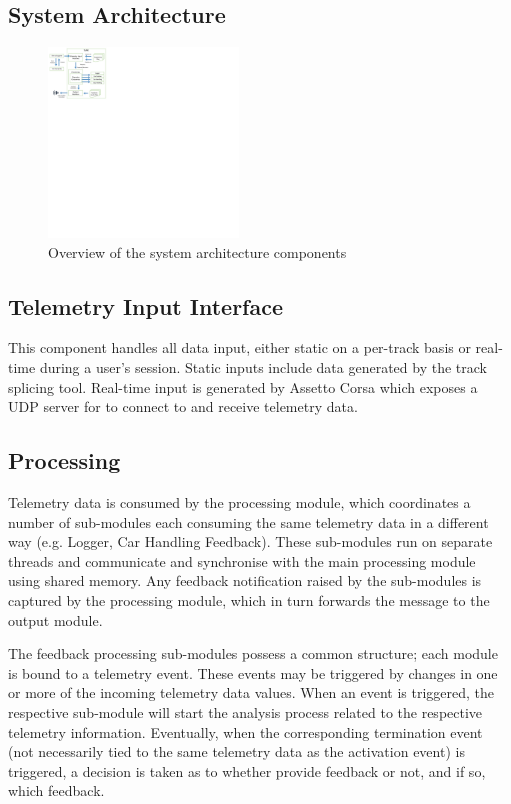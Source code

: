 \documentclass{sig-alternate}
\begin{document}
\subsection{System Architecture}

\begin{figure}[!htb]
	\centering
	\includegraphics[width=0.45\textwidth]{diagrams/SystemArch}
	\caption{Overview of the system architecture components}
	\label{fig:SystemArch}
\end{figure}

\subsection{Telemetry Input Interface}
This component handles all data input, either static on a per-track basis or real-time during a user's session. Static inputs include data generated by the track splicing tool. Real-time input is generated by Assetto Corsa which exposes a UDP server for \methodname to connect to and receive telemetry data.

\subsection{Processing}
Telemetry data is consumed by the processing module, which coordinates a number of sub-modules each consuming the same telemetry data in a different way (e.g. Logger, Car Handling Feedback). These sub-modules run on separate threads and communicate and synchronise with the main processing module using shared memory. Any feedback notification raised by the sub-modules is captured by the processing module, which in turn forwards the message to the output module.

The feedback processing sub-modules possess a common structure; each module is bound to a telemetry event. These events may be triggered by changes in one or more of the incoming telemetry data values. When an event is triggered, the respective sub-module will start the analysis process related to the respective telemetry information. Eventually, when the corresponding termination event (not necessarily tied to the same telemetry data as the activation event) is triggered, a decision is taken as to whether provide feedback or not, and if so, which feedback.
\end{document}

